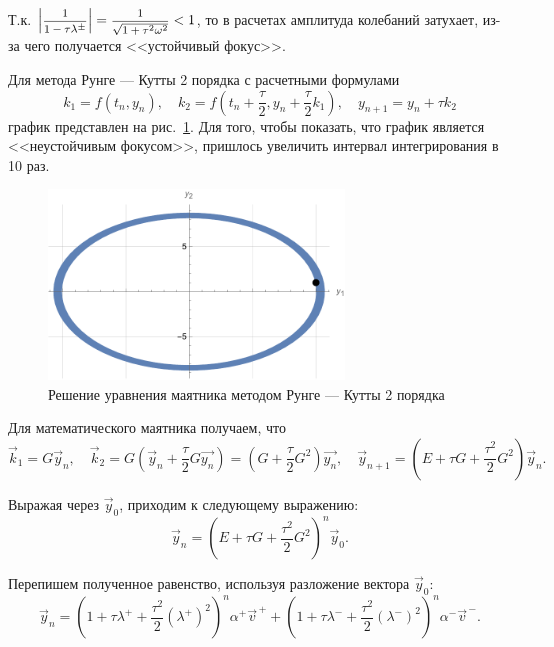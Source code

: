 \documentclass[12pt, a4paper]{article}
\begin{document}
	Т.к. $\left|\hbox{\footnotesize$\displaystyle\frac{1}{1 - \tau \lambda^\pm}$}\right| = \hbox{\footnotesize$\displaystyle\frac{1}{\sqrt{1+ \tau^2 \omega^2}}$} < 1$, то в расчетах амплитуда колебаний затухает, из-за чего получается <<устойчивый фокус>>.
	
	Для метода Рунге --- Кутты 2 порядка с расчетными формулами
	\[
	k_1 = f(t_n, y_n), \quad k_2 = f(t_n +\frac\tau2, y_n + \frac\tau2 k_1), \quad y_{n+1} = y_n + \tau k_2
	\]
	график представлен на рис.~\ref{rk2_pend}. Для того, чтобы показать, что график является <<неустойчивым фокусом>>, пришлось увеличить интервал интегрирования в 10 раз.
	
	\begin{figure}[!h]
		\centering
		\includegraphics[width=0.7\textwidth]{rk2_pend}
		\caption{Решение уравнения маятника методом Рунге --- Кутты 2 порядка}
		\label{rk2_pend}
	\end{figure}
	
	Для математического маятника получаем, что
	\begin{equation*}
		\vec{k}_1 = G \vec{y}_n, \quad  \vec{k}_2 = G(\vec{y}_n + \frac\tau2 G \vec{y_n}) = (G + \frac\tau2 G^2)\vec{y_n}, \quad \vec{y}_{n+1} = \left(E + \tau G + \frac{\tau^2}2 G^2\right) \vec{y}_n.
	\end{equation*}
	
	Выражая через $\vec{y}_0$, приходим к следующему выражению:
	\begin{equation*}
		\vec{y}_n = \left(E + \tau G + \frac{\tau^2}2 G^2\right)^n \vec{y}_0.
	\end{equation*}
	
	Перепишем полученное равенство, используя разложение вектора $\vec{y}_0$:
	\begin{equation*}
		\vec{y}_n = \left(1 + \tau \lambda^+ + \frac{\tau^2}2 (\lambda^+)^2\right)^n \alpha^+ \vec{v}^{\,+} + \left(1 + \tau \lambda^- + \frac{\tau^2}2 (\lambda^-)^2\right)^n \alpha^- \vec{v}^{\,-}.
	\end{equation*}
	
\end{document}
